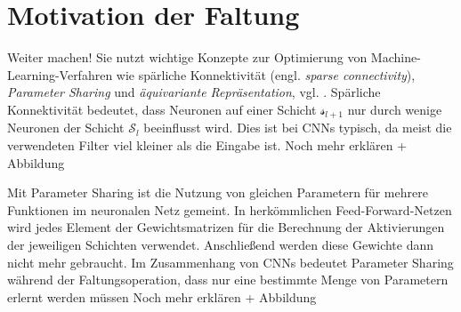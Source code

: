 




\section{Motivation der Faltung}
Weiter machen!
Sie nutzt wichtige Konzepte zur Optimierung von Machine-Learning-Verfahren wie spärliche Konnektivität (engl. \textit{sparse connectivity}), \textit{Parameter Sharing} und \textit{äquivariante Repräsentation}, vgl. \cite{goodfellow}. Spärliche Konnektivität bedeutet, dass Neuronen auf einer Schicht $\mathcal{s}_{l+1}$ nur durch wenige Neuronen der Schicht $\mathcal{S}_l$ beeinflusst wird. Dies ist bei CNNs typisch, da meist die verwendeten Filter viel kleiner als die Eingabe ist. Noch mehr erklären + Abbildung

Mit Parameter Sharing ist die Nutzung von gleichen Parametern für mehrere Funktionen im neuronalen Netz gemeint. In herkömmlichen Feed-Forward-Netzen wird jedes Element der Gewichtsmatrizen für die Berechnung der Aktivierungen der jeweiligen Schichten verwendet. Anschließend werden diese Gewichte dann nicht mehr gebraucht. Im Zusammenhang von CNNs bedeutet Parameter Sharing während der Faltungsoperation, dass nur eine bestimmte Menge von Parametern erlernt werden müssen
Noch mehr erklären + Abbildung

